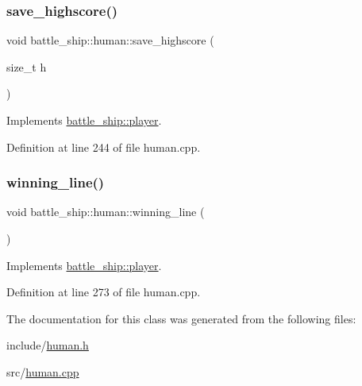 \subsubsection{\texorpdfstring{save\+\_\+highscore()}{save\_highscore()}}
{\footnotesize\ttfamily void battle\+\_\+ship\+::human\+::save\+\_\+highscore (\begin{DoxyParamCaption}\item[{size\+\_\+t}]{h }\end{DoxyParamCaption})\hspace{0.3cm}{\ttfamily [virtual]}}



Implements \hyperlink{classbattle__ship_1_1player_a928538249678aea5402f8c673671e995}{battle\+\_\+ship\+::player}.



Definition at line 244 of file human.\+cpp.

\mbox{\label{classbattle__ship_1_1human_a583d0a9dd05c16f700d0d1825916faa3}} 
\subsubsection{\texorpdfstring{winning\+\_\+line()}{winning\_line()}}
{\footnotesize\ttfamily void battle\+\_\+ship\+::human\+::winning\+\_\+line (\begin{DoxyParamCaption}{ }\end{DoxyParamCaption})\hspace{0.3cm}{\ttfamily [virtual]}}



Implements \hyperlink{classbattle__ship_1_1player_a3110ec708fd8fc7e02a6e88a63d57d2f}{battle\+\_\+ship\+::player}.



Definition at line 273 of file human.\+cpp.



The documentation for this class was generated from the following files\+:\begin{DoxyCompactItemize}
\item 
include/\hyperlink{human_8h}{human.\+h}\item 
src/\hyperlink{human_8cpp}{human.\+cpp}\end{DoxyCompactItemize}
